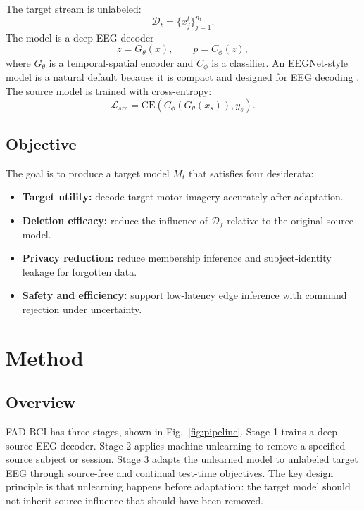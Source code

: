 \documentclass[10pt,twocolumn]{article}
\begin{document}
The target stream is unlabeled:
\begin{equation}
\mathcal{D}_t=\{x_j^t\}_{j=1}^{n_t}.
\end{equation}
The model is a deep EEG decoder
\begin{equation}
z=G_\theta(x), \qquad p=C_\phi(z),
\end{equation}
where $G_\theta$ is a temporal-spatial encoder and $C_\phi$ is a classifier. An EEGNet-style model is a natural default because it is compact and designed for EEG decoding \cite{lawhern2018eegnet}. The source model is trained with cross-entropy:
\begin{equation}
\mathcal{L}_{src}=\mathrm{CE}(C_\phi(G_\theta(x_s)),y_s).
\end{equation}

\subsection{Objective}
The goal is to produce a target model $M_t$ that satisfies four desiderata:
\begin{itemize}
\item \textbf{Target utility:} decode target motor imagery accurately after adaptation.
\item \textbf{Deletion efficacy:} reduce the influence of $\mathcal{D}_f$ relative to the original source model.
\item \textbf{Privacy reduction:} reduce membership inference and subject-identity leakage for forgotten data.
\item \textbf{Safety and efficiency:} support low-latency edge inference with command rejection under uncertainty.
\end{itemize}

\section{Method}
\subsection{Overview}
FAD-BCI has three stages, shown in Fig.~\ref{fig:pipeline}. Stage 1 trains a deep source EEG decoder. Stage 2 applies machine unlearning to remove a specified source subject or session. Stage 3 adapts the unlearned model to unlabeled target EEG through source-free and continual test-time objectives. The key design principle is that unlearning happens before adaptation: the target model should not inherit source influence that should have been removed.
\end{document}
